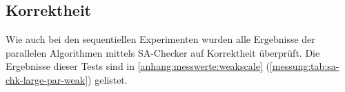 \subsection{\sa Korrektheit}

Wie auch bei den sequentiellen Experimenten wurden alle Ergebnisse der parallelen Algorithmen mittels SA-Checker auf Korrektheit überprüft.
Die Ergebnisse dieser Tests sind in \cref{anhang:messwerte:weakscale} (\cref{messung:tab:sa-chk-large-par-weak}) gelistet.
